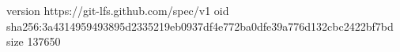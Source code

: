 version https://git-lfs.github.com/spec/v1
oid sha256:3a4314959493895d2335219eb0937df4e772ba0dfe39a776d132cbc2422bf7bd
size 137650
